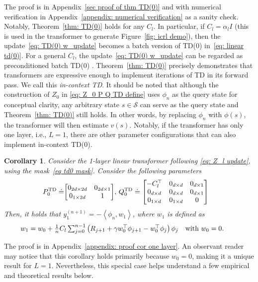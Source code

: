 \documentclass{article}
\newcommand{\indot}[2]{{\left<#1, #2\right>}}
\newcommand{\td}{\text{TD}}
\newtheorem{corollary}{Corollary}
\begin{document}
The proof is in Appendix~\ref{sec proof of thm TD(0)} and with numerical verification in Appendix~\ref{appendix: numerical verification} as a sanity check. 
Notably, Theorem~\ref{thm: TD(0)} holds for any $C_l$.
In particular,
if $C_l = \alpha_l I$ (this is used in the transformer to generate Figure~\ref{fig: icrl demo}),
then the update~\eqref{eq: TD(0) w_update} becomes a batch version of TD(0) in~\eqref{eq: linear td(0)}.
For a general $C_l$,
the update~\eqref{eq: TD(0) w_update} can be regarded as preconditioned batch TD(0) \citep{yao2008preconditioned}.
Theorem~\ref{thm: TD(0)} precisely demonstrates that transformers are expressive enough to implement iterations of TD in its forward pass.
We call this \emph{in-context TD}.
It should be noted that although the construction of $Z_0$ in \eqref{eq: Z_0 P Q TD define} uses $\phi_n$ as the query state for conceptual clarity, any arbitrary state $s \in \mathcal{S}$ can serve as the query state and Theorem~\ref{thm: TD(0)} still holds.
In other words, by replacing $\phi_n$ with $\phi(s)$,
the transformer will then estimate $v(s)$.
Notably,
if the transformer has only one layer, i.e., $L=1$,
there are other parameter configurations that can also implement in-context TD(0).
\begin{corollary}
    \label{cor one layer}
    Consider the 1-layer linear transformer following \eqref{eq: Z_l update}, using the mask~\eqref{eq td0 mask}.
    Consider the following parameters
    \begin{align}
        \label{eq pq one layer}
        P_0^{\td} \doteq& \mqty[0_{2d \times 2d} & 0_{2d \times 1} \\ 0_{1 \times 2d} & 1], \,    Q_0^{\td} \doteq \mqty[-C_l^\top & 0_{d\times d} & 0_{d \times 1} \\ 0_{d \times d} & 0_{d \times d} & 0_{d \times 1} \\ 0_{1 \times d} & 0_{1 \times d} & 0]
    \end{align}
    Then, it holds that $y_1^{(n+1)} =  - \indot{\phi_n}{w_1}$,
    where $w_1$ is defined as 
    \begin{align}
     w_{1} &\textstyle = w_0 + \frac{1}{n} C_l \sum_{j=0}^{n-1}  \left(R_{j+1} + \gamma w_0^\top\phi_{j+1} - w_0^\top\phi_j\right)\phi_j \qq{with $w_0 = 0$.}
    \end{align}
\end{corollary}
The proof is in Appendix~\ref{appendix: proof cor one layer}. An observant reader may notice that this corollary holds primarily because $w_0 = 0$, making it a unique result for $L=1$.
Nevertheless, 
this special case helps understand a few empirical and theoretical results below.
    
\end{document}
